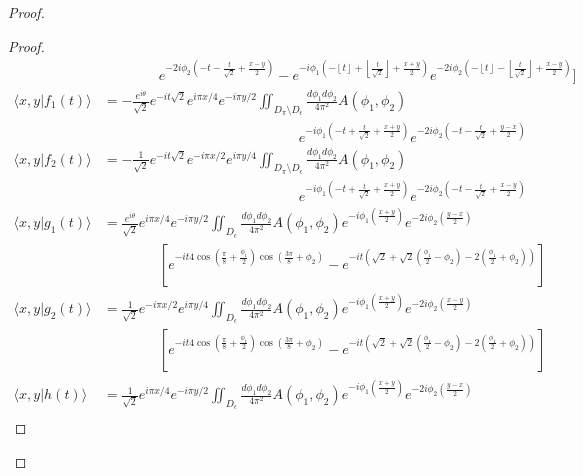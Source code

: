 \documentclass[../thesis-main/thesis-main]{subfiles}
\begin{document}
\begin{proof}
\begin{proof}
\begin{align*}
& \qquad\qquad e^{-2i\phi_{2}\left(-t-\frac{t}{\sqrt{2}}+\frac{x-y}{2}\right)}
		-e^{-i\phi_{1}\left(-\left\lfloor t\right\rfloor +\left\lfloor \frac{t}{\sqrt{2}}\right\rfloor +
		\frac{x+y}{2}\right)}e^{-2i\phi_{2}\left(-\left\lfloor t\right\rfloor -\left\lfloor 
		\frac{t}{\sqrt{2}}\right\rfloor +\frac{x-y}{2}\right)}\bigg]\\
\langle x,y|f_{1}(t)\rangle & = -
	\frac{e^{i\theta}}{\sqrt{2}} e^{-it\sqrt{2}}e^{i \pi x/4} 
	e^{-i\pi y/2}\iint_{D_{\pi}\setminus D_{\epsilon}}\frac{d\phi_{1}d\phi_{2}}{4\pi^{2}}
	A(\phi_{1},\phi_{2})\\
&  \qquad\qquad\qquad\qquad \qquad\qquad \qquad 
	e^{-i\phi_{1}\left(-t+\frac{t}{\sqrt{2}}+\frac{x+y}{2}\right)}e^{-2i\phi_{2}
	\left(-t-\frac{t}{\sqrt{2}}+\frac{y-x}{2}\right)}\\
\langle x,y|f_{2}(t)\rangle & =  -\frac{1}{\sqrt{2}}e^{-it\sqrt{2}}e^{-i\pi x/2}e^{i\pi y/4 }
	\iint_{D_{\pi}\setminus D_{\epsilon}}\frac{d\phi_{1}d\phi_{2}}{4\pi^{2}}
	A(\phi_{1},\phi_{2})\\
&  \qquad\qquad\qquad\qquad \qquad\qquad \qquad e^{-i\phi_{1}\left(-t+\frac{t}{\sqrt{2}}+\frac{x+y}{2}\right)}
	e^{-2i\phi_{2}\left(-t-\frac{t}{\sqrt{2}}+\frac{x-y}{2}\right)}\\
\langle x,y|g_{1}(t)\rangle & =   \frac{e^{i\theta}}{\sqrt{2}}e^{i \pi x/4}e^{- i \pi y/2}
	\iint_{D_{\epsilon}}\frac{d\phi_{1}d\phi_{2}}{4\pi^{2}}A(\phi_{1},\phi_{2})
	e^{-i\phi_{1}\left(\frac{x+y}{2}\right)}e^{-2i\phi_{2}\left(\frac{y-x}{2}\right)}\\
& \qquad \qquad 
	\left[e^{-it 4\cos(\frac{\pi}{8}+\frac{\phi_{1}}{2})\cos(\frac{3\pi}{8}
	+\phi_{2})} -e^{-it\left(\sqrt{2}+\sqrt{2}\left(\frac{\phi_{1}}{2}-\phi_{2}\right)
 	-2\left(\frac{\phi_{1}}{2}+\phi_{2}\right)\right)}\right]\\
\langle x,y|g_{2}(t)\rangle & =  \frac{1}{\sqrt{2}}e^{-i\pi x/2}e^{i\pi y/4}
	\iint_{D_{\epsilon}}\frac{d\phi_{1}d\phi_{2}}{4\pi^{2}}A(\phi_{1},\phi_{2})
	e^{-i\phi_{1}\left(\frac{x+y}{2}\right)}e^{-2i\phi_{2}\left(\frac{x-y}{2}\right)}\\
 & \qquad\qquad\left[e^{-it 4\cos(\frac{\pi}{8}+\frac{\phi_{1}}{2})\cos(\frac{3\pi}{8}+\phi_{2})} - e^{-it\left(\sqrt{2}+\sqrt{2}\left(\frac{\phi_{1}}{2}-\phi_{2}\right)
 	-2\left(\frac{\phi_{1}}{2}+\phi_{2}\right)\right)}\right]\\
\langle x,y|h(t)\rangle & =  \frac{1}{\sqrt{2}}e^{i\pi x/4}e^{-i \pi y/2}
	\iint_{D_{\epsilon}}\frac{d\phi_{1}d\phi_{2}}{4\pi^{2}}
	A(\phi_{1},\phi_{2})e^{-i\phi_{1}\left(\frac{x+y}{2}\right)}e^{-2i\phi_{2}\left(\frac{y-x}{2}\right)}\\

\end{align*}
\end{proof}
\end{proof}
\end{document}
